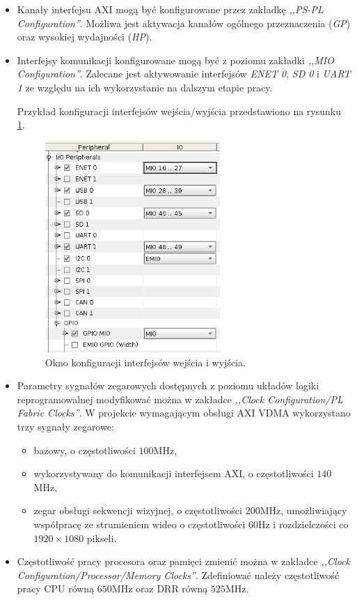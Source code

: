 \begin{itemize}
	\item Kanały interfejsu AXI mogą być konfigurowane przez zakładkę \emph{,,PS-PL Configuration''}. Możliwa jest aktywacja kanałów ogólnego przeznaczenia (\emph{GP}) oraz wysokiej wydajności (\emph{HP}).
	
	\item Interfejsy komunikacji konfigurowane mogą być z poziomu zakładki \emph{,,MIO Configuration''}. Zalecane jest aktywowanie interfejsów \emph{ENET 0}, \emph{SD 0} i \emph{UART 1} ze względu na ich wykorzystanie na dalszym etapie pracy.
	
	Przykład konfiguracji interfejsów wejścia/wyjścia przedstawiono na rysunku \ref{fig:vivado-mio-configuration}.
	\begin{figure}[ht]
		\centering
		\includegraphics[height=8cm]{img/vivado/mio-configuration.png}
		\caption{Okno konfiguracji interfejsów wejścia i wyjścia.}
		\label{fig:vivado-mio-configuration}
	\end{figure}
	
	\item Parametry sygnałów zegarowych dostępnych z poziomu układów logiki reprogramowalnej modyfikować można w zakładce \emph{,,Clock Configuration/PL Fabric Clocks''}. W projekcie wymagającym obsługi AXI VDMA wykorzystano trzy sygnały zegarowe:
	\begin{itemize}[label=\textbullet]
		\item bazowy, o częstotliwości $100$MHz,
		\item wykorzystywany do komunikacji interfejsem AXI, o częstotliwości $140$MHz,
		\item zegar obsługi sekwencji wizyjnej, o częstotliwości $200$MHz, umożliwiający współpracę ze strumieniem wideo o częstotliwości $60$Hz i rozdzielczości co $1920 \times 1080$ pikseli.
	\end{itemize}
	
	\item Częstotliwość pracy procesora oraz pamięci zmienić można w zakładce \emph{,,Clock Configuration/Processor/Memory Clocks''}. Zdefiniować należy częstotliwość pracy CPU równą $650$MHz oraz DRR równą $525$MHz.
	
\end{itemize}

